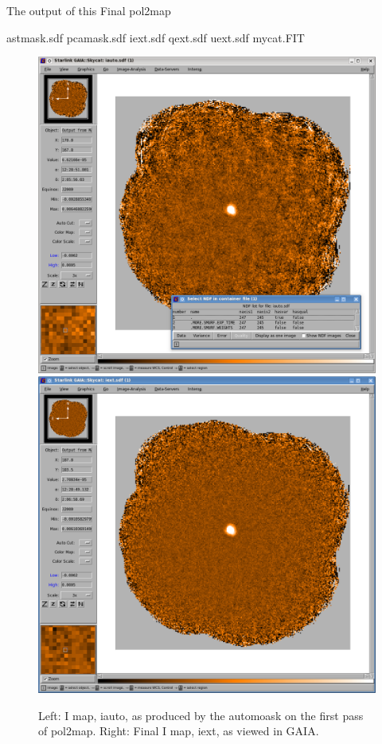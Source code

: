 The output of this Final pol2map


\begin{terminalv}
astmask.sdf
pcamask.sdf
iext.sdf
qext.sdf
uext.sdf
mycat.FIT
\end{terminalv}


\begin{figure}[t!]
\begin{center}
\includegraphics[width=0.46\linewidth]{sc22-gaia-view-iauto.png}
\includegraphics[width=0.46\linewidth]{sc22-gaia-view-iext.png}
\label{fig:gaia-iext}
\caption [Final I map in GAIA]{
  \small Left: I map, iauto, as produced by the automoask on the first pass of pol2map. Right: Final I map, iext, as viewed in GAIA.
}
\end{center}
\end{figure}


